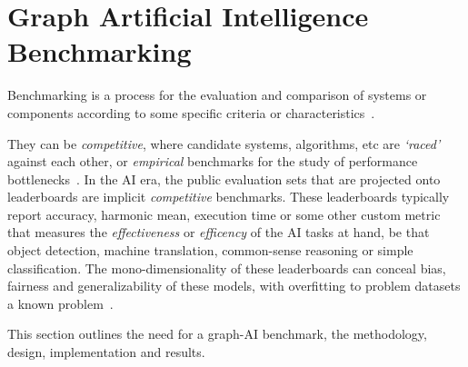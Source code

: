 
\renewcommand{\thechapter}{3}
\chapter{Graph Artificial Intelligence Benchmarking}
\label{chapter:30-Graph-AI-Benchmarking}

Benchmarking is a process for the evaluation and comparison of systems or components according to some specific criteria or characteristics~\cite{Kistowski2015}.

%
%

They can be \textit{competitive}, where candidate systems, algorithms, etc are \textit{`raced'} against each other, or \textit{empirical} benchmarks for the study of performance bottlenecks~\cite{Saavedra1996}.
In the AI era, the public evaluation sets that are projected onto leaderboards are implicit \textit{competitive} benchmarks.
These leaderboards typically report accuracy, harmonic mean, execution time or some other custom metric that measures the \textit{effectiveness} or \textit{efficency} of the AI tasks at hand, be that object detection, machine translation, common-sense reasoning or simple classification. 
The mono-dimensionality of these leaderboards can conceal bias, fairness and generalizability of these models, with overfitting to problem datasets a known problem~\cite{Hooker1994, Hooker1995}.

%
%

%

%
This section outlines the need for a graph-AI benchmark, the methodology, design, implementation and results. 












